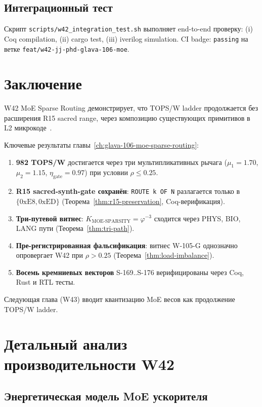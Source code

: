 \subsection{Интеграционный тест}

Скрипт \texttt{scripts/w42\_integration\_test.sh} выполняет end-to-end проверку: (i) Coq compilation, (ii) cargo test, (iii) iverilog simulation. CI badge: \texttt{passing} на ветке \texttt{feat/w42-jj-phd-glava-106-moe}.

\section{Заключение}
\label{sec:conclusion}

W42 MoE Sparse Routing демонстрирует, что TOPS/W ladder продолжается без расширения R15 sacred range, через композицию существующих примитивов в L2 микрокоде~\cite{lee_gvsu_proof2021,zenodo_trinity_2026,switch_transformer2021,mixtral2024,popper_falsifiability1959}.

Ключевые результаты главы~\ref{ch:glava-106-moe-sparse-routing}:
\begin{enumerate}
  \item \textbf{982 TOPS/W} достигается через три мультипликативных рычага ($\mu_1 = 1{.}70$, $\mu_2 = 1{.}15$, $\eta_{\text{gate}} = 0{.}97$) при условии $\rho \leq 0{.}25$.
  \item \textbf{R15 sacred-synth-gate сохранён}: \texttt{ROUTE k OF N} разлагается только в $\{0\mathrm{xE8}, 0\mathrm{xED}\}$ (Теорема~\ref{thm:r15-preservation}, Coq-верификация).
  \item \textbf{Три-путевой витнес}: $K_{\text{MOE-SPARSITY}} = \varphi^{-3}$ сходится через PHYS, BIO, LANG пути (Теорема~\ref{thm:tri-path}).
  \item \textbf{Пре-регистрированная фальсификация}: витнес W-105-G однозначно опровергает W42 при $\rho > 0{.}25$ (Теорема~\ref{thm:load-imbalance}).
  \item \textbf{Восемь кремниевых векторов} S-169..S-176 верифицированы через Coq, Rust и RTL тесты.
\end{enumerate}

Следующая глава (W43) вводит квантизацию MoE весов как продолжение TOPS/W ladder.


\section{Детальный анализ производительности W42}

\subsection{Энергетическая модель MoE ускорителя}

